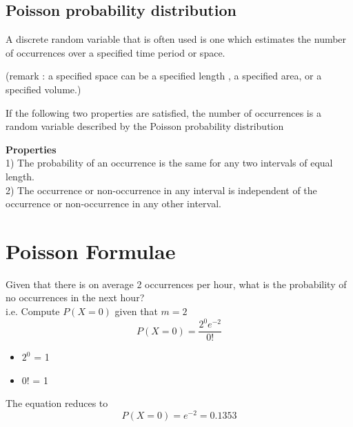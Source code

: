 \documentclass[]{article}
\begin{document}
\tableofcontents

\newpage
\Large

\subsection{Poisson probability distribution}

A discrete random variable that is often used is one which estimates the number of occurrences  over a specified time period or space.

(remark : a specified space can be a specified length , a specified area, or a specified volume.)

If the following two properties are satisfied, the number of occurrences is a random variable described by the Poisson probability distribution

\textbf{Properties}\\
1)      The probability of an occurrence is the same for any two intervals of equal length.\\
2)      The occurrence or non-occurrence in any interval is independent of the occurrence or non-occurrence in any other interval.\\



\section{Poisson Formulae}
	Given that there is on average 2 occurrences per hour, what is the probability of no occurrences in the next hour? \\ i.e. Compute $P(X=0)$ given that $m=2$
	\Large
	\[ P(X = 0)=\frac{2^0 e^{-2}}{0!} \]
	\normalsize
	\begin{itemize}
		\item $2^0$ = 1
		\item $0!$ = 1
	\end{itemize}
	The equation reduces to
	\[ P(X = 0)=e^{-2} = 0.1353\]

\newpage
\large
\end{document}

